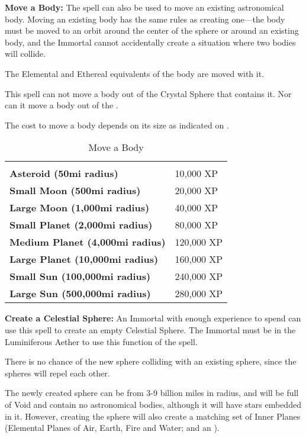 \begin{multicols*}{2}
\textbf{Move a Body:} The spell can also be used to move an existing astronomical body. Moving an existing body has the same rules as creating one—the body must be moved to an orbit around the center of the sphere or around an existing body, and the Immortal cannot accidentally create a situation where two bodies will collide.

The Elemental and Ethereal equivalents of the body are moved with it.

This spell can not move a body out of the Crystal Sphere that contains it. Nor can it move a body out of the .

The cost to move a body depends on its size as indicated on .

\begin {table}[H]
  \caption{Move a Body}\label{tab:Move a Body}
  \begin{tabularx}{\columnwidth}{>{\bfseries}YY}
   & \\
	Asteroid (50mi radius) & 10,000 XP\\
	Small Moon (500mi radius) & 20,000 XP\\
	Large Moon (1,000mi radius) & 40,000 XP\\
	Small Planet (2,000mi radius) & 80,000 XP\\
	Medium Planet (4,000mi radius) & 120,000 XP\\
	Large Planet (10,000mi radius) & 160,000 XP\\
	Small Sun (100,000mi radius) & 240,000 XP\\
	Large Sun (500,000mi radius) & 280,000 XP
  \end {tabularx}
\end {table}

\textbf{Create a Celestial Sphere:} An Immortal with enough experience to spend can use this spell to create an empty Celestial Sphere. The Immortal must be in the Luminiferous Aether to use this function of the spell.

There is no chance of the new sphere colliding with an existing sphere, since the spheres will repel each other.

The newly created sphere can be from 3-9 billion miles in radius, and will be full of Void and contain no astronomical bodies, although it will have stars embedded in it. However, creating the sphere will also create a matching set of Inner Planes (Elemental Planes of Air, Earth, Fire and Water; and an ).


\end{multicols*}
